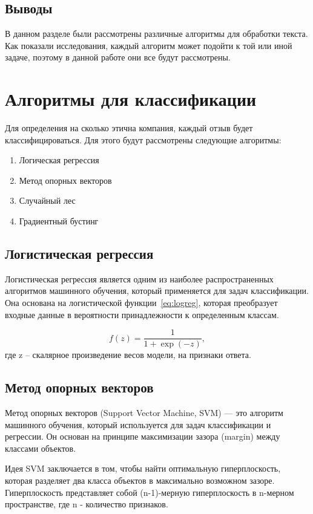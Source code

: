 \documentclass[PI, VKR]{HSEUniversity}
\begin{document}
\subsection{Выводы}
\label{sec:orgeefd61a}
В данном разделе были рассмотрены различные алгоритмы для обработки текста. Как показали исследования\autocite{gonzalez-carvajal_comparing_}, каждый алгоритм может подойти к той или иной задаче, поэтому в данной работе они все будут рассмотрены.
\section{Алгоритмы для классификации}
\label{sec:org0072ce5}
Для определения на сколько этична компания, каждый отзыв будет классифицироваться. Для этого будут рассмотрены следующие алгоритмы:
\begin{enumerate}
\item Логическая регрессия
\item Метод опорных векторов
\item Случайный лес
\item Градиентный бустинг
\end{enumerate}
\subsection{Логистическая регрессия}
\label{sec:org1078411}
Логистическая регрессия\autocite{fan_liblinear_2008} является одним из наиболее распространенных алгоритмов машинного обучения, который применяется для задач классификации. Она основана на логистической функции~\ref{eq:logreg}, которая преобразует входные данные в вероятности принадлежности к определенным классам.

\begin{equation}
\label{eq:logreg}
f(z)=\frac{1}{1+\exp(-z)},
\end{equation}
где z -- скалярное произведение весов модели, на признаки ответа.
\subsection{Метод опорных векторов}
\label{sec:org7053629}
Метод опорных векторов\autocite{platt_probabilistic_2000} (Support Vector Machine, SVM) — это алгоритм машинного обучения, который используется для задач классификации и регрессии. Он основан на принципе максимизации зазора (margin) между классами объектов.

Идея SVM заключается в том, чтобы найти оптимальную гиперплоскость, которая разделяет два класса объектов в максимально возможном зазоре. Гиперплоскость представляет собой (n-1)-мерную гиперплоскость в n-мерном пространстве, где n - количество признаков.
\end{document}
